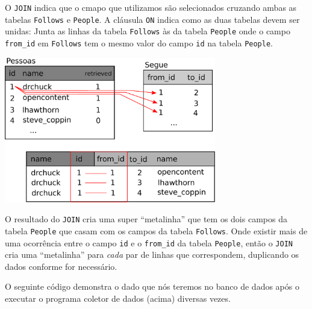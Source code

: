 %
O {\tt JOIN} indica que o cmapo que utilizamos são selecionados cruzando ambas
as tabelas {\tt Follows} e {\tt People}. A cláusula {\tt ON} indica como as
duas tabelas devem ser unidas: Junta as linhas da tabela {\tt Follows} às da
tabela {\tt People} onde o campo \verb"from_id" em {\tt Follows} tem o mesmo
valor do campo {\tt id} na tabela {\tt People}.

\beforefig
\centerline{\includegraphics[height=2.50in]{figs2/join.eps}}
\afterfig


O resultado do {\tt JOIN} cria uma super ``metalinha'' que tem os dois campos
da tabela {\tt People} que casam com os campos da tabela {\tt Follows}. Onde
existir mais de uma ocorrência entre o campo {\tt id} e o \verb"from_id" da
tabela {\tt People}, então o {\tt JOIN} cria uma ``metalinha'' para \emph{cada}
par de linhas que correspondem, duplicando os dados conforme for necessário.


O seguinte código demonstra o dado que nós teremos no banco de dados após o
executar o programa coletor de dados (acima) diversas vezes.

